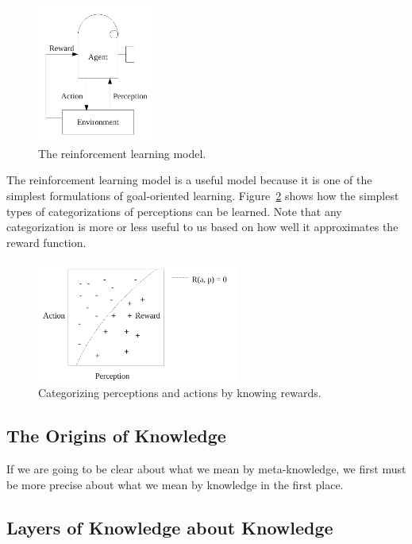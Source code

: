 \begin{figure}[bth]
  \center
  \includegraphics[width=4cm]{gfx/reinforcement_learning}
  \caption[The reinforcement learning model]{The reinforcement learning model.}
  \label{fig:reinforcement_learning}
\end{figure}

The reinforcement learning model is a useful model because it is one
of the simplest formulations of goal-oriented learning.
Figure~\ref{fig:perception_categorization} shows how the simplest
types of categorizations of perceptions can be learned.  Note that any
categorization is more or less useful to us based on how well it
approximates the reward function.

\begin{figure}[bth]
  \center
  \includegraphics[height=4cm]{gfx/perception_categorization}
  \caption[Categorizing perceptions and actions by knowing rewards]{Categorizing perceptions and actions by knowing rewards.}
  \label{fig:perception_categorization}
\end{figure}




\subsection{The Origins of Knowledge}

If we are going to be clear about what we mean by meta-knowledge, we
first must be more precise about what we mean by knowledge in the
first place.


\subsection{Layers of Knowledge about Knowledge}



